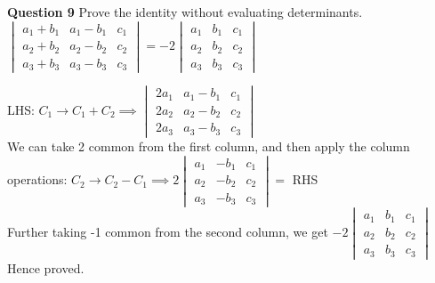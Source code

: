 \documentclass[addpoints]{exam}
\begin{document}
\begin{sloppypar}
\begin{questions}
        \question
        \textbf{Question 9} Prove the identity without evaluating determinants. \\ 
        $ \begin{vmatrix}
            a_1 + b_1 & a_1 - b_1 & c_1 \\ 
            a_2 + b_2 & a_2 - b_2 & c_2 \\
            a_3 + b_3 & a_3 - b_3 & c_3
        \end{vmatrix} = -2 \begin{vmatrix}
            a_1 & b_1 & c_1 \\
            a_2 & b_2 & c_2 \\ 
            a_3 & b_3 & c_3
        \end{vmatrix}$
        \begin{solution}
            LHS: $ C_1 \rightarrow C_1 + C_2 \implies \begin{vmatrix}
                2a_1 & a_1 - b_1 & c_1 \\
                2a_2 & a_2 - b_2 & c_2 \\ 
                2a_3 & a_3 - b_3 & c_3  
            \end{vmatrix} $ \\ 
            We can take 2 common from the first column, and then apply the column operations: $ C_2 \rightarrow C_2 - C_1 \implies 2\begin{vmatrix}
                a_1 & -b_1 & c_1 \\
                a_2 & -b_2 & c_2 \\ 
                a_3 & -b_3 & c_3  
            \end{vmatrix} = $ RHS \\ 
            Further taking -1 common from the second column, we get $ -2\begin{vmatrix}
                a_1 & b_1 & c_1 \\
                a_2 & b_2 & c_2 \\ 
                a_3 & b_3 & c_3
            \end{vmatrix} $ Hence proved.
        \end{solution}


\end{questions}
\end{sloppypar}
\end{document}
